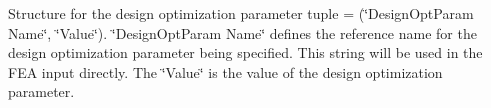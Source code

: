 Structure for the design optimization parameter tuple = (\char`\"{}\+Design\+Opt\+Param Name\char`\"{}, \char`\"{}\+Value\char`\"{}). \char`\"{}\+Design\+Opt\+Param Name\char`\"{} defines the reference name for the design optimization parameter being specified. This string will be used in the FEA input directly. The \char`\"{}\+Value\char`\"{} is the value of the design optimization parameter. 